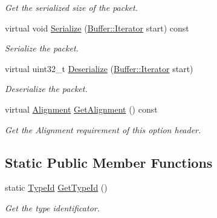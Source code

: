 \begin{DoxyCompactItemize}
\begin{DoxyCompactList}\small\item\em Get the serialized size of the packet. \end{DoxyCompactList}\item 
virtual void \hyperlink{classns3_1_1dsr_1_1DsrOptionRerrUnsupportHeader_a797b41d9c8fa55f825ac24dadb16fd7b}{Serialize} (\hyperlink{classns3_1_1Buffer_1_1Iterator}{Buffer\+::\+Iterator} start) const 
\begin{DoxyCompactList}\small\item\em Serialize the packet. \end{DoxyCompactList}\item 
virtual uint32\+\_\+t \hyperlink{classns3_1_1dsr_1_1DsrOptionRerrUnsupportHeader_ad568e52cacee0c67a43338e8838806a5}{Deserialize} (\hyperlink{classns3_1_1Buffer_1_1Iterator}{Buffer\+::\+Iterator} start)
\begin{DoxyCompactList}\small\item\em Deserialize the packet. \end{DoxyCompactList}\item 
virtual \hyperlink{structns3_1_1dsr_1_1DsrOptionHeader_1_1Alignment}{Alignment} \hyperlink{classns3_1_1dsr_1_1DsrOptionRerrUnsupportHeader_a3e4a9c982d37472eb21e19ef6909a3e2}{Get\+Alignment} () const 
\begin{DoxyCompactList}\small\item\em Get the Alignment requirement of this option header. \end{DoxyCompactList}\end{DoxyCompactItemize}
\subsection*{Static Public Member Functions}
\begin{DoxyCompactItemize}
\item 
static \hyperlink{classns3_1_1TypeId}{Type\+Id} \hyperlink{classns3_1_1dsr_1_1DsrOptionRerrUnsupportHeader_a1e089bbdfe6542928ea854e9a2f2e995}{Get\+Type\+Id} ()
\begin{DoxyCompactList}\small\item\em Get the type identificator. \end{DoxyCompactList}\end{DoxyCompactItemize}
